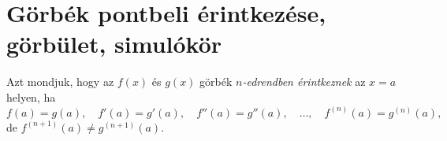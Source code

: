 \documentclass[11pt]{article}
\begin{document}
\section{Görbék pontbeli érintkezése, görbület, simulókör}

\begin{defbox}
\begin{definition}[Érintkezés]
Azt mondjuk, hogy az $f(x)$ és $g(x)$ görbék \emph{$n$-edrendben érintkeznek} az $x=a$ helyen, ha
\[
f(a)=g(a),\quad f'(a)=g'(a),\quad f''(a)=g''(a),\quad\dots,\quad f^{(n)}(a)=g^{(n)}(a),
\]
de $f^{(n+1)}(a)\neq g^{(n+1)}(a)$.
\end{definition}
\end{defbox}
\end{document}
